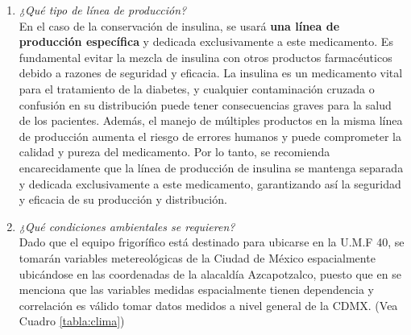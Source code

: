 \begin{enumerate}
	\item \textit{¿Qué tipo de línea de producción?}\\
En el caso de la conservación de insulina, se usará \textbf{una línea de producción específica} y dedicada exclusivamente a este medicamento. Es fundamental evitar la mezcla de insulina con otros productos farmacéuticos debido a razones de seguridad y eficacia. La insulina es un medicamento vital para el tratamiento de la diabetes, y cualquier contaminación cruzada o confusión en su distribución puede tener consecuencias graves para la salud de los pacientes. Además, el manejo de múltiples productos en la misma línea de producción aumenta el riesgo de errores humanos y puede comprometer la calidad y pureza del medicamento. Por lo tanto, se recomienda encarecidamente que la línea de producción de insulina se mantenga separada y dedicada exclusivamente a este medicamento, garantizando así la seguridad y eficacia de su producción y distribución. \cite{david-umf}
	\item \textit{¿Qué condiciones ambientales se requieren?}\\
	Dado que el equipo frigorífico está destinado para ubicarse en la U.M.F 40, se tomarán variables metereológicas de la Ciudad de México espacialmente ubicándose en las coordenadas de la alacaldía Azcapotzalco, puesto que en \cite{cressie-1993} se menciona que las variables medidas espacialmente tienen dependencia y correlación es válido tomar datos medidos a nivel general de la CDMX. (Vea Cuadro \ref{tabla:clima}) 
	 
		
		 

\end{enumerate}
